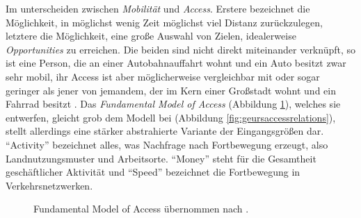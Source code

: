 \documentclass[11pt,pdftex,a4paper]{scrartcl}
\begin{document}
	Im  unterscheiden \textcite{levinsonTransportAccessManual2020} zwischen \textit{Mobilität} und \textit{Access}. Erstere bezeichnet die Möglichkeit, in möglichst wenig Zeit möglichst viel Distanz zurückzulegen, letztere die Möglichkeit, eine große Auswahl von Zielen, idealerweise \textit{Opportunities} zu erreichen. Die beiden sind nicht direkt miteinander verknüpft, so ist eine Person, die an einer Autobahnauffahrt wohnt und ein Auto besitzt zwar sehr mobil, ihr Access ist aber möglicherweise vergleichbar mit oder sogar geringer als jener von jemandem, der im Kern einer Großstadt wohnt und ein Fahrrad besitzt \parencite[Beispiel abgeändert nach][17]{levinsonTransportAccessManual2020}. Das \textit{Fundamental Model of Access} \parencite[18]{levinsonTransportAccessManual2020} (Abbildung \ref{fig:fundamentalmodelofaccess}), welches sie entwerfen, gleicht grob dem Modell bei \textcite{geursAccessibilityEvaluationLanduse2004} (Abbildung \ref{fig:geursaccessrelations}), stellt allerdings eine stärker abstrahierte Variante der Eingangsgrößen dar. \enquote{Activity} bezeichnet alles, was Nachfrage nach Fortbewegung erzeugt, also Landnutzungsmuster und Arbeitsorte. \enquote{Money} steht für die Gesamtheit geschäftlicher Aktivität und \enquote{Speed} bezeichnet die Fortbewegung in Verkehrsnetzwerken.
		\begin{figure}[!htb]
		
		\caption[Fundamental Model of Access nach \textcite[18]{levinsonTransportAccessManual2020}]{Fundamental Model of Access übernommen nach \textcite[18]{levinsonTransportAccessManual2020}.}
		\label{fig:fundamentalmodelofaccess}
	\end{figure}
\end{document}
